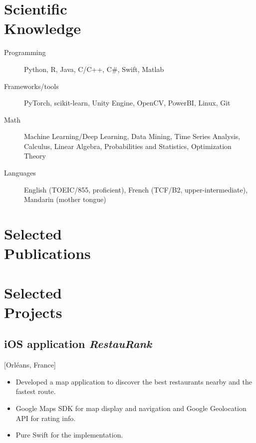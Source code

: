 \documentclass{mycv}
\begin{document}
\section{Scientific \\ Knowledge}

\begin{description}
  \item[Programming] Python, R, Java, C/C++, C\#, Swift, Matlab
  \item[Frameworks/tools] PyTorch, scikit-learn, Unity Engine, OpenCV, PowerBI, Linux, Git
  \item[Math] Machine Learning/Deep Learning, Data Mining, Time Series Analysis, Calculus, Linear Algebra, Probabilities and Statistics, Optimization Theory
  \item[Languages] English (TOEIC/855, proficient), French (TCF/B2, upper-intermediate), Mandarin (mother tongue)
\end{description}

\section{Selected \\ Publications}


\section{Selected \\ Projects}

\subsection{iOS application \textit{RestauRank}}[Orl\'eans, France]
\begin{positions}
\end{positions}

\begin{itemize}
  \item Developed a map application to discover the best restaurants nearby and the fastest route.
  \item Google Maps SDK for map display and navigation and Google Geolocation API for rating info.
  \item Pure Swift for the implementation.
\end{itemize}
\end{document}

